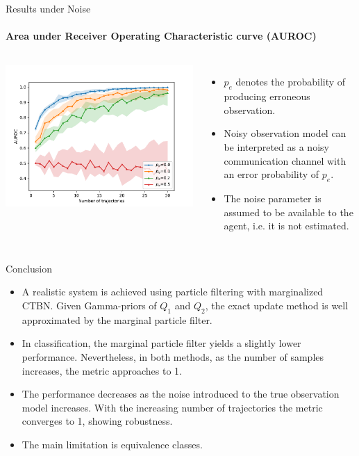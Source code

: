 \documentclass[
	english,%
	aspectratio=169,%
	color={accentcolor=3b},
	logo=true,%
	colorframetitle=false,%
	]{tudabeamer}
\begin{document}
\begin{frame}{Results under Noise}
\framesubtitle{Area under Receiver Operating Characteristic curve (AUROC)}
\begin{columns}[onlytextwidth,c]
	\centering
	\includegraphics[width=\linewidth]{figures/error_AUROC_perc_0}
	\begin{itemize}
		\item $ p_e $ denotes the probability of producing erroneous observation.
		\item Noisy observation model can be interpreted as a noisy communication channel with an error probability of $ p_e $.
		\item The noise parameter is assumed to be available to the agent, i.e. it is not estimated.
	\end{itemize}
\end{columns}
\end{frame}


\begin{frame}{Conclusion}
\begin{itemize}
	\item A realistic system is achieved using particle filtering with marginalized CTBN. Given Gamma-priors of $ Q_1 $ and $ Q_2 $, the exact update method is well approximated by the marginal particle filter.
	\item In classification, the marginal particle filter yields a slightly lower performance. Nevertheless, in both methods, as the number of samples increases, the metric approaches to 1.
	\item The performance decreases as the noise introduced to the
	true observation model increases. With the increasing number of
	trajectories the metric converges to 1, showing robustness.
	\item The main limitation is equivalence classes.
\end{itemize}
\end{frame}
\end{document}
